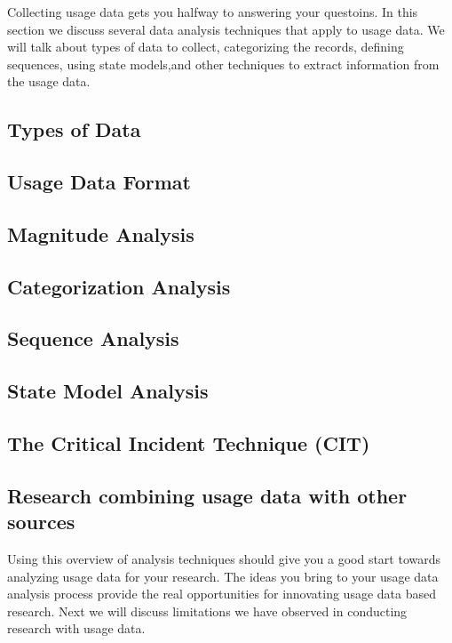 Collecting usage data gets you halfway to answering your questoins.  In this section we discuss several data analysis techniques that apply to usage data.  We will talk about types of data to collect, categorizing the records, defining sequences, using state models,and other techniques to extract information from the usage data.

\subsection{Types of Data}


\subsection{Usage Data Format}


\subsection{Magnitude Analysis}


\subsection{Categorization Analysis}


\subsection{Sequence Analysis}


\subsection{State Model Analysis}


\subsection{The Critical Incident Technique (CIT)}


\subsection{Research combining usage data with other sources}


\vspace{0.1in}
Using this overview of analysis techniques should give you a good start towards analyzing usage data for your research.
The ideas you bring to your usage data analysis process provide the real opportunities for innovating usage data based research.  Next we will discuss limitations we have observed in conducting research with usage data.


